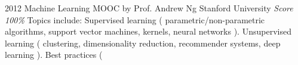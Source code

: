 \documentclass[11pt,a4paper]{moderncv}
\begin{document}
\cventry                                                                                                          %
    {2012}                                                                                                        %
    {Machine Learning}                                                                                            %
    {MOOC by Prof. Andrew Ng}                                                                                     %
    {Stanford University}                                                                                         %
    {\textit{Score 100\%}}                                                                                        %
    {                                                                                                             %
        Topics include:                                                                                           %
            Supervised learning (                                                                                 %
                    parametric/non-parametric algorithms,                                                         %
                    support vector machines,                                                                      %
                    kernels,                                                                                      %
                    neural networks                                                                               %
                ).                                                                                                %
            Unsupervised learning (                                                                               %
                    clustering,                                                                                   %
                    dimensionality reduction,                                                                     %
                    recommender systems,                                                                          %
                    deep learning                                                                                 %
                ).                                                                                                %
            Best practices (                                                                                      %
}
\end{document}
